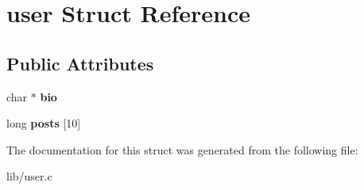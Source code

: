 \hypertarget{structuser}{}\section{user Struct Reference}
\label{structuser}
\subsection*{Public Attributes}
\begin{DoxyCompactItemize}
\item 
char $\ast$ {\bfseries bio}\hypertarget{structuser_a836f0f349078239d6f9f6091c1c770fe}{}\label{structuser_a836f0f349078239d6f9f6091c1c770fe}

\item 
long {\bfseries posts} \mbox{[}10\mbox{]}\hypertarget{structuser_aacfeb3f2fa91d7d7ea0d72a1eb74e6f3}{}\label{structuser_aacfeb3f2fa91d7d7ea0d72a1eb74e6f3}

\end{DoxyCompactItemize}


The documentation for this struct was generated from the following file\+:\begin{DoxyCompactItemize}
\item 
lib/user.\+c\end{DoxyCompactItemize}
